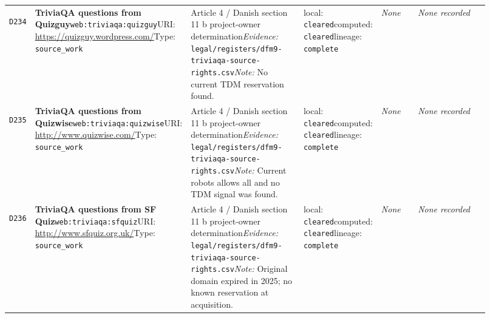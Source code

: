 \documentclass[9pt,a4paper]{article}
\newcommand{\depid}[1]{\hypertarget{dep:#1}{\texttt{#1}}}
\begin{document}
\begin{landscape}
\begin{longtable}{@{}L{0.035\linewidth}L{0.185\linewidth}L{0.27\linewidth}L{0.09\linewidth}L{0.10\linewidth}L{0.24\linewidth}@{}}
\depid{D234} & \textbf{TriviaQA questions from Quizguy}\newline \nolinkurl{web:triviaqa:quizguy}\newline URI: \url{https://quizguy.wordpress.com/}\newline Type: \texttt{source\_work} & Article 4 / Danish section 11 b project-owner determination\newline \textit{Evidence:} \nolinkurl{legal/registers/dfm9-triviaqa-source-rights.csv}\newline \textit{Note:} No current TDM reservation found. & local: \texttt{cleared}\newline computed: \texttt{cleared}\newline lineage: \texttt{complete} & \textit{None} & \textit{None recorded} \\
\depid{D235} & \textbf{TriviaQA questions from Quizwise}\newline \nolinkurl{web:triviaqa:quizwise}\newline URI: \url{http://www.quizwise.com/}\newline Type: \texttt{source\_work} & Article 4 / Danish section 11 b project-owner determination\newline \textit{Evidence:} \nolinkurl{legal/registers/dfm9-triviaqa-source-rights.csv}\newline \textit{Note:} Current robots allows all and no TDM signal was found. & local: \texttt{cleared}\newline computed: \texttt{cleared}\newline lineage: \texttt{complete} & \textit{None} & \textit{None recorded} \\
\depid{D236} & \textbf{TriviaQA questions from SF Quiz}\newline \nolinkurl{web:triviaqa:sfquiz}\newline URI: \url{http://www.sfquiz.org.uk/}\newline Type: \texttt{source\_work} & Article 4 / Danish section 11 b project-owner determination\newline \textit{Evidence:} \nolinkurl{legal/registers/dfm9-triviaqa-source-rights.csv}\newline \textit{Note:} Original domain expired in 2025; no known reservation at acquisition. & local: \texttt{cleared}\newline computed: \texttt{cleared}\newline lineage: \texttt{complete} & \textit{None} & \textit{None recorded} \\

\end{longtable}
\end{landscape}
\end{document}
